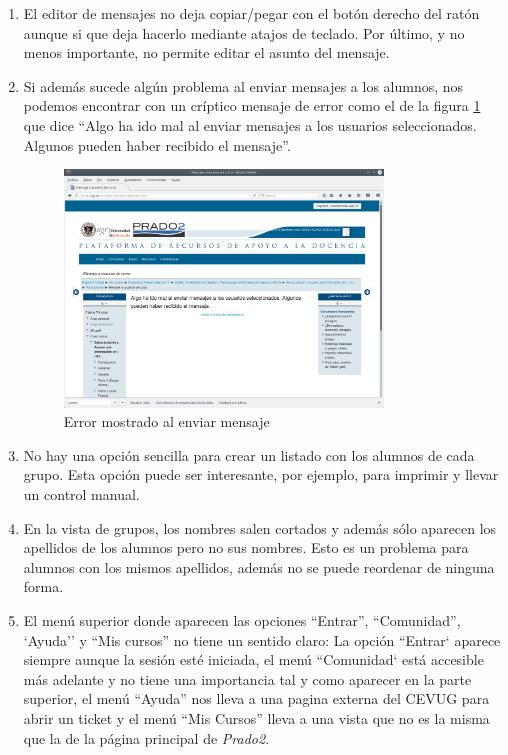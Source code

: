 \begin{enumerate}
\item El editor de mensajes no deja copiar/pegar con el botón derecho del ratón aunque si que deja hacerlo mediante atajos de teclado. Por último, y no menos importante, no permite editar el asunto del mensaje. 

\item Si además sucede algún problema al enviar mensajes a los alumnos, nos podemos encontrar con un críptico mensaje de error como el de la figura \ref{fig:pantallazoPradoMensaje2} que dice  ``Algo ha ido mal al enviar mensajes a los usuarios seleccionados. Algunos pueden haber recibido el mensaje''.


\begin{figure}[h!]
\centering
\includegraphics[width=0.8\textwidth]{../screenshots/pantallazoPradoMensaje2}
\caption{Error mostrado al enviar mensaje}
\label{fig:pantallazoPradoMensaje2}
\end{figure}


\item No hay una opción sencilla para crear un listado con los alumnos de cada grupo. Esta  opción puede ser interesante, por ejemplo, para imprimir y llevar un control manual.

\item En la vista de grupos, los nombres salen cortados y además sólo aparecen los apellidos de los alumnos pero no sus nombres. Esto es un problema para alumnos con los mismos apellidos, además no se puede reordenar de ninguna forma.

\item El menú superior donde aparecen las opciones ``Entrar'', ``Comunidad'', `Ayuda'' y ``Mis cursos'' no tiene un sentido claro: La opción ``Entrar` aparece siempre aunque la sesión esté iniciada, el menú ``Comunidad` está accesible más adelante y no tiene una importancia tal y como aparecer en la parte superior, el menú ``Ayuda'' nos lleva a una pagina externa del CEVUG para abrir un ticket y el menú ``Mis Cursos'' lleva a una vista que no es la misma que la de la página principal de \textit{Prado2}.


\end{enumerate}

